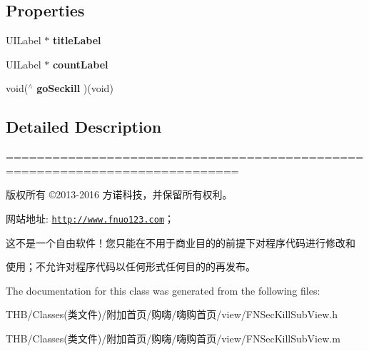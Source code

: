 \subsection*{Properties}
\begin{DoxyCompactItemize}
\item 
\mbox{\label{interface_f_n_sec_kill_sub_view_a64f5a296b14c17d440cbc9a61b15908e}} 
U\+I\+Label $\ast$ {\bfseries title\+Label}
\item 
\mbox{\label{interface_f_n_sec_kill_sub_view_af2ba930ce145336215bd78d24a92c0f0}} 
U\+I\+Label $\ast$ {\bfseries count\+Label}
\item 
\mbox{\label{interface_f_n_sec_kill_sub_view_aec26d455a56437f6630018c7444452ad}} 
void($^\wedge$ {\bfseries go\+Seckill} )(void)
\end{DoxyCompactItemize}


\subsection{Detailed Description}
============================================================================

版权所有 ©2013-\/2016 方诺科技，并保留所有权利。

网站地址\+: \href{http://www.fnuo123.com}{\tt http\+://www.\+fnuo123.\+com}； 



这不是一个自由软件！您只能在不用于商业目的的前提下对程序代码进行修改和

使用；不允许对程序代码以任何形式任何目的的再发布。 

 

The documentation for this class was generated from the following files\+:\begin{DoxyCompactItemize}
\item 
T\+H\+B/\+Classes(类文件)/附加首页/购嗨/嗨购首页/view/F\+N\+Sec\+Kill\+Sub\+View.\+h\item 
T\+H\+B/\+Classes(类文件)/附加首页/购嗨/嗨购首页/view/F\+N\+Sec\+Kill\+Sub\+View.\+m\end{DoxyCompactItemize}
